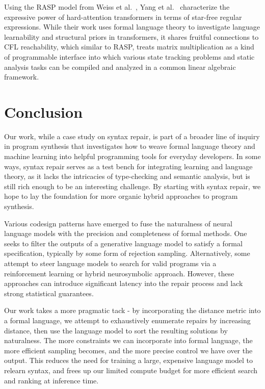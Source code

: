 \documentclass[sigplan,acmsmall,nonacm,screen]{acmart}\settopmatter{printfolios=false,printccs=false,printacmref=false}
\begin{document}
Using the RASP model from Weiss et al.~\cite{weiss2021thinking}, Yang et al.~\cite{yang2024masked} characterize the expressive power of hard-attention transformers in terms of star-free regular expressions. While their work uses formal language theory to investigate language learnability and structural priors in transformers, it shares fruitful connections to CFL reachability, which similar to RASP, treats matrix multiplication as a kind of programmable interface into which various state tracking problems and static analysis tasks can be compiled and analyzed in a common linear algebraic framework.

\clearpage\section{Conclusion}\label{sec:conclusion}

Our work, while a case study on syntax repair, is part of a broader line of inquiry in program synthesis that investigates how to weave formal language theory and machine learning into helpful programming tools for everyday developers. In some ways, syntax repair serves as a test bench for integrating learning and language theory, as it lacks the intricacies of type-checking and semantic analysis, but is still rich enough to be an interesting challenge. By starting with syntax repair, we hope to lay the foundation for more organic hybrid approaches to program synthesis.

Various codesign patterns have emerged to fuse the naturalness of neural language models with the precision and completeness of formal methods. One seeks to filter the outputs of a generative language model to satisfy a formal specification, typically by some form of rejection sampling. Alternatively, some attempt to steer language models to search for valid programs via a reinforcement learning or hybrid neurosymbolic approach. However, these approaches can introduce significant latency into the repair process and lack strong statistical guarantees.

Our work takes a more pragmatic tack - by incorporating the distance metric into a formal language, we attempt to exhaustively enumerate repairs by increasing distance, then use the language model to sort the resulting solutions by naturalness. The more constraints we can incorporate into formal language, the more efficient sampling becomes, and the more precise control we have over the output. This reduces the need for training a large, expensive language model to relearn syntax, and frees up our limited compute budget for more efficient search and ranking at inference time.
\end{document}
